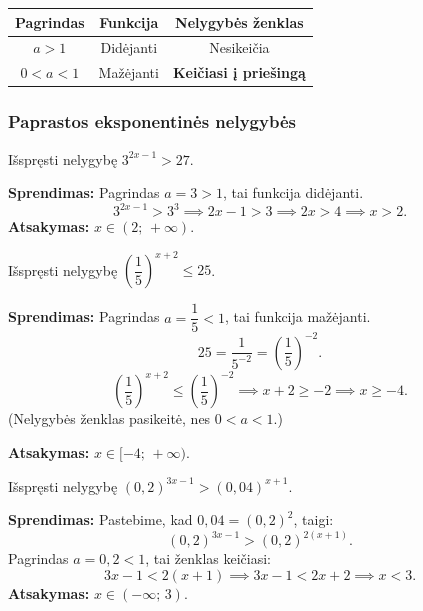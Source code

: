 \begin{tcolorbox}[title={Atminties lentelė: nelygybės ženklas}, colback=blue!5!white, colframe=blue!60!black]
\begin{center}
\begin{tabular}{|c|c|c|}
\hline
\textbf{Pagrindas} & \textbf{Funkcija} & \textbf{Nelygybės ženklas} \\
\hline
$a > 1$ & Didėjanti & Nesikeičia \\
$0 < a < 1$ & Mažėjanti & \textbf{Keičiasi į priešingą} \\
\hline
\end{tabular}
\end{center}
\end{tcolorbox}

\subsubsection*{Paprastos eksponentinės nelygybės}

\begin{example}
Išspręsti nelygybę $3^{2x-1} > 27$.

\textbf{Sprendimas:} Pagrindas $a = 3 > 1$, tai funkcija didėjanti.
\[
3^{2x-1} > 3^3 \implies 2x - 1 > 3 \implies 2x > 4 \implies x > 2.
\]
\textbf{Atsakymas:} $x \in (2;\, +\infty)$.
\end{example}

\begin{example}
Išspręsti nelygybę $\left(\dfrac{1}{5}\right)^{x+2} \leq 25$.

\textbf{Sprendimas:} Pagrindas $a = \dfrac{1}{5} < 1$, tai funkcija mažėjanti.
\[
25 = \frac{1}{5^{-2}} = \left(\frac{1}{5}\right)^{-2}.
\]
\[
\left(\frac{1}{5}\right)^{x+2} \leq \left(\frac{1}{5}\right)^{-2} \implies x + 2 \geq -2 
\implies x \geq -4.
\]
(Nelygybės ženklas pasikeitė, nes $0 < a < 1$.)

\textbf{Atsakymas:} $x \in [-4;\, +\infty)$.
\end{example}

\begin{example}
Išspręsti nelygybę $\left(0{,}2\right)^{3x-1} > \left(0{,}04\right)^{x+1}$.

\textbf{Sprendimas:} Pastebime, kad $0{,}04 = (0{,}2)^2$, taigi:
\[
(0{,}2)^{3x-1} > (0{,}2)^{2(x+1)}.
\]
Pagrindas $a = 0{,}2 < 1$, tai ženklas keičiasi:
\[
3x - 1 < 2(x+1) \implies 3x - 1 < 2x + 2 \implies x < 3.
\]
\textbf{Atsakymas:} $x \in (-\infty;\, 3)$.
\end{example}

